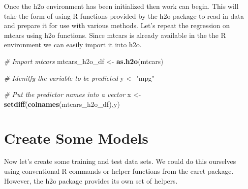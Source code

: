 \documentclass[
]{book}
\newenvironment{Shaded}{\begin{snugshade}}{\end{snugshade}}
\newcommand{\CommentTok}[1]{\textcolor[rgb]{0.56,0.35,0.01}{\textit{#1}}}
\newcommand{\KeywordTok}[1]{\textcolor[rgb]{0.13,0.29,0.53}{\textbf{#1}}}
\newcommand{\NormalTok}[1]{#1}
\newcommand{\StringTok}[1]{\textcolor[rgb]{0.31,0.60,0.02}{#1}}
\begin{document}
Once the h2o environment has been initialized then work can begin. This will take the form of using R functions provided by the h2o package to read in data and prepare it for use with various methods. Let's repeat the regression on mtcars using h2o functions. Since mtcars is already available in the the R environment we can easily import it into h2o.

\begin{Shaded}
\begin{Highlighting}[]
\CommentTok{# Import mtcars}
\NormalTok{mtcars_h2o_df <-}\StringTok{ }\KeywordTok{as.h2o}\NormalTok{(mtcars)}

\CommentTok{# Idenitfy the variable to be predicted}
\NormalTok{y <-}\StringTok{ "mpg"}

\CommentTok{# Put the predictor names into a vector}
\NormalTok{x <-}\StringTok{ }\KeywordTok{setdiff}\NormalTok{(}\KeywordTok{colnames}\NormalTok{(mtcars_h2o_df),y)}
\end{Highlighting}
\end{Shaded}

\hypertarget{create-some-models}{%
\section{Create Some Models}\label{create-some-models}}

Now let's create some training and test data sets. We could do this ourselves using conventional R commands or helper functions from the caret package. However, the h2o package provides its own set of helpers.
\end{document}
